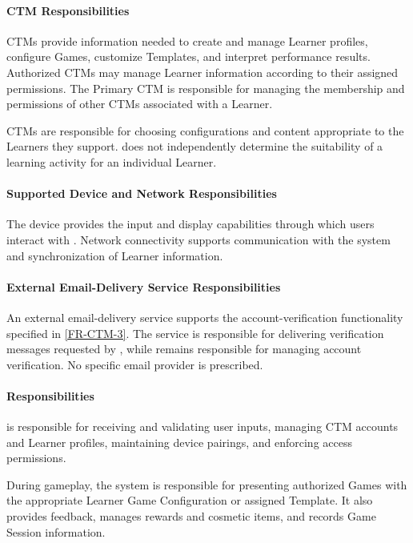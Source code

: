 \documentclass[12pt]{article}
\begin{document}
\paragraph{CTM Responsibilities}

CTMs provide information needed to create and manage Learner profiles, configure
Games, customize Templates, and interpret performance results. Authorized CTMs
may manage Learner information according to their assigned permissions. The
Primary CTM is responsible for managing the membership and permissions of other
CTMs associated with a Learner.

CTMs are responsible for choosing configurations and content appropriate to the
Learners they support. \progname{} does not independently determine the
suitability of a learning activity for an individual Learner.

\paragraph{Supported Device and Network Responsibilities}

The device provides the input and display capabilities through which users
interact with \progname{}. Network connectivity supports communication with the
system and synchronization of Learner information.

\paragraph{External Email-Delivery Service Responsibilities}

An external email-delivery service supports the account-verification
functionality specified in \ref{FR-CTM-3}. The service is responsible for
delivering verification messages requested by \progname{}, while \progname{}
remains responsible for managing account verification. No specific email
provider is prescribed.

\paragraph{\progname{} Responsibilities}

\progname{} is responsible for receiving and validating user inputs, managing
CTM accounts and Learner profiles, maintaining device pairings, and enforcing
access permissions.

During gameplay, the system is responsible for presenting authorized Games with
the appropriate Learner Game Configuration or assigned Template. It also
provides feedback, manages rewards and cosmetic items, and records Game Session
information.
\end{document}
